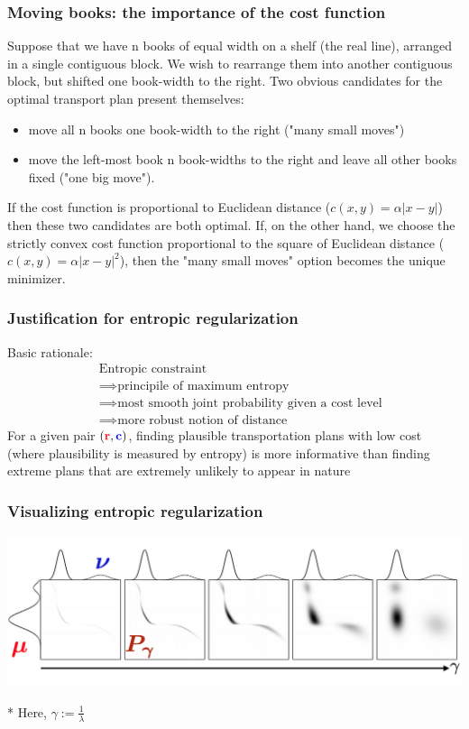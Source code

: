 \documentclass[mathserif,compress,xcolor={dvipsnames}]{beamer}
\renewcommand\;{\,}
\begin{document}
\begin{frame}\frametitle{Moving books: the importance of the cost function}
Suppose that we have n books of equal width on a shelf (the real line), arranged in a single contiguous block. We wish to rearrange them into another contiguous block, but shifted one book-width to the right. Two obvious candidates for the optimal transport plan present themselves:
\begin{itemize}
\item
move all n books one book-width to the right ("many small moves")
\item
move the left-most book n book-widths to the right and leave all other books fixed ("one big move").
\end{itemize}
If the cost function is proportional to Euclidean distance ($c(x, y) = \alpha|x - y|$) then these two candidates are both optimal. If, on the other hand, we choose the strictly convex cost function proportional to the square of Euclidean distance ($c(x, y) = \alpha|x - y|^2$), then the "many small moves" option becomes the unique minimizer.
\end{frame}

\begin{frame}\frametitle{Justification for entropic regularization}
Basic rationale:
\begin{align*}
\; & \text{Entropic constraint} \\
& \implies \text{principile of maximum entropy} \\
& \implies \text{most smooth joint probability given a cost level} \\
& \implies \text{more robust notion of distance}
\end{align*}
For a given pair $({\color{red} \mathbf r}, {\color{blue} \mathbf c})$, finding plausible transportation plans with low cost (where plausibility
is measured by entropy) is more informative than finding extreme plans that are
extremely unlikely to appear in nature
\end{frame}

\begin{frame}\frametitle{Visualizing entropic regularization}
\begin{center}
\includegraphics[width=\linewidth]{Figures/EntropyPlots.png}
\end{center}
* Here, $\gamma := \frac{1}{\lambda}$
\end{frame}
\end{document}
